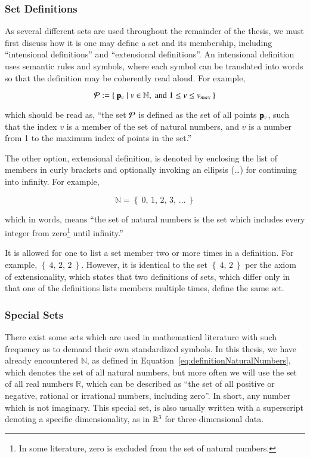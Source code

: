 %
%
\subsubsection{Set Definitions}
\label{ch2sETBssSTsssSD}
As several different sets are used throughout the remainder of the thesis, we must first discuss how it is one may define a set and its membership, including ``intensional definitions'' and ``extensional definitions''. An intensional definition uses semantic rules and symbols, where each symbol can be translated into words so that the definition may be coherently read aloud. For example,

\begin{equation}
	\mathcal{P} := \left \{\:\mathbf{p}_v \mid v \in \mathbb{N}, \;\text{and}\; 1\leq v \leq v_{max}\:\right \}
\end{equation}

which should be read as, ``the set $\mathcal{P}$ is defined as the set of all points $\mathbf{p}_v$, such that the index $v$ is a member of the set of natural numbers, and $v$ is a number from 1 to the maximum index of points in the set.''

The other option, extensional definition, is denoted by enclosing the list of members in curly brackets and optionally invoking an ellipsis (\dots) for continuing into infinity. For example,

\begin{equation}
	\mathbb{N} = \left \{\:0,\,1,\,2,\,3,\,\ldots\:\right \}
	\label{eq:definitionNaturalNumbers}
\end{equation}

which in words, means ``the set of natural numbers is the set which includes every integer from zero\footnote{In some literature, zero is excluded from the set of natural numbers.} until infinity.''

It is allowed for one to list a set member two or more times in a definition. For example, $\left \{\:4,\,2,\,2\:\right \}$. However, it is identical to the set $\left \{\:4,\,2\:\right \}$ per the axiom of extensionality, which states that two definitions of sets, which differ only in that one of the definitions lists members multiple times, define the same set.

%
%
\subsubsection{Special Sets}
\label{ch2sETBssSTsssSS}
There exist some sets which are used in mathematical literature with such frequency as to demand their own standardized symbols. In this thesis, we have already encountered $\mathbb{N}$, as defined in Equation~\ref{eq:definitionNaturalNumbers}, which denotes the set of all natural numbers, but more often we will use the set of all real numbers $\mathbb{R}$, which can be described as ``the set of all positive or negative, rational or irrational numbers, including zero''. In short, any number which is not imaginary. This special set, is also usually written with a superscript denoting a specific dimensionality, as in $\mathbb{R}^{3}$ for three-dimensional data.


